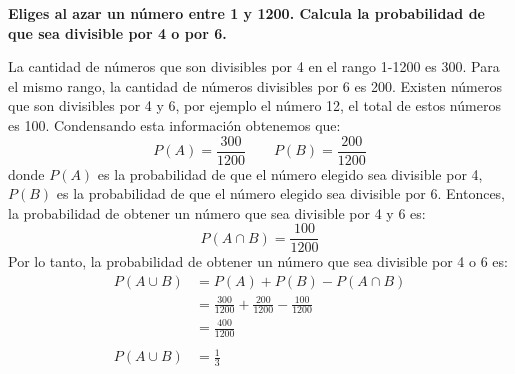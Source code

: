 \item \textbf{Eliges al azar un número entre 1 y 1200. Calcula la probabilidad de que sea divisible por 4 o por 6.}

La cantidad de números que son divisibles por 4 en el rango 1-1200 es 300. Para el mismo rango, la cantidad de números divisibles por 6 es 200. Existen números que son divisibles por 4 y 6, por ejemplo el número 12, el total de estos números es 100. Condensando esta información obtenemos que:
\begin{equation*}
    P(A)= \frac{300}{1200} \qquad P(B)= \frac{200}{1200}
\end{equation*}
donde $P(A)$ es la probabilidad de que el número elegido sea divisible por 4, $P(B)$ es la probabilidad de que el número elegido sea divisible por 6. Entonces, la probabilidad de obtener un número que sea divisible por 4 y 6 es:
\begin{equation*}
    P(A\cap B)= \frac{100}{1200}
\end{equation*}
Por lo tanto, la probabilidad de obtener un número que sea divisible por 4 o 6 es:
\begin{align*}
    P(A\cup B) & = P(A)+P(B)-P(A\cap B)                                   \\
               & = \frac{300}{1200} + \frac{200}{1200} - \frac{100}{1200} \\
               & = \frac{400}{1200}                                       \\
               &                                                          \\
    P(A\cup B) & = \frac{1}{3}
\end{align*}

